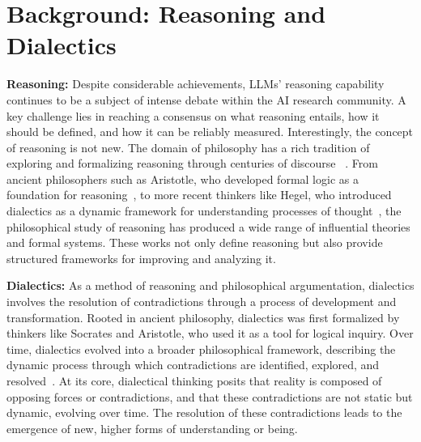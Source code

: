 \section{Background: Reasoning and Dialectics}
\label{sec:background}

\textbf{Reasoning:} Despite considerable achievements, LLMs' reasoning capability continues to be a subject of intense debate within the AI research community. A key challenge lies in reaching a consensus on what reasoning entails, how it should be defined, and how it can be reliably measured. Interestingly, the concept of reasoning is not new. The domain of philosophy has a rich tradition of exploring and formalizing reasoning through centuries of discourse
~\cite{aristotle_prior_analytics, aristotle_metaphysics, plato_republic, descartes_meditations, hume_treatise_human_nature, kant_critique_pure_reason, mill_system_logic, hegel_phenomenology_spirit, nietzsche_beyond_good_evil, wittgenstein_tractatus, heidegger_being_time, popper_logic_scientific_discovery, kuhn_structure_scientific_revolutions, adorno_negative_dialectics}.
From ancient philosophers such as Aristotle, who developed formal logic as a foundation for reasoning~\cite{aristotle_prior_analytics, aristotle_metaphysics}, to more recent thinkers like Hegel, who introduced dialectics as a dynamic framework for understanding processes of thought~\cite{hegel_science_logic,hegel_phenomenology_spirit}, the philosophical study of reasoning has produced a wide range of influential theories and formal systems. These works not only define reasoning but also provide structured frameworks for improving and analyzing it.

\textbf{Dialectics:} As a method of reasoning and philosophical argumentation, dialectics involves the resolution of contradictions through a process of development and transformation. Rooted in ancient philosophy, dialectics was first formalized by thinkers like Socrates and Aristotle, who used it as a tool for logical inquiry. Over time, dialectics evolved into a broader philosophical framework, describing the dynamic process through which contradictions are identified, explored, and resolved~\cite{hegel_phenomenology_spirit,engels_dialectics_nature}. At its core, dialectical thinking posits that reality is composed of opposing forces or contradictions, and that these contradictions are not static but dynamic, evolving over time. The resolution of these contradictions leads to the emergence of new, higher forms of understanding or being.


